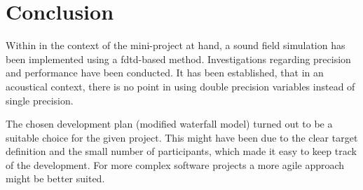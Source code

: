 \chapter{Conclusion}
Within in the context of the mini-project at hand, a sound field simulation has been implemented using a \gls{fdtd}-based method. Investigations regarding precision and performance have been conducted. It has been established, that in an acoustical context, there is no point in using double precision variables instead of single precision. 

The chosen development plan (modified waterfall model) turned out to be a suitable choice for the given project. This might have been due to the clear target definition and the small number of participants, which made it easy to keep track of the development. For more complex software projects a more agile approach might be better suited. 